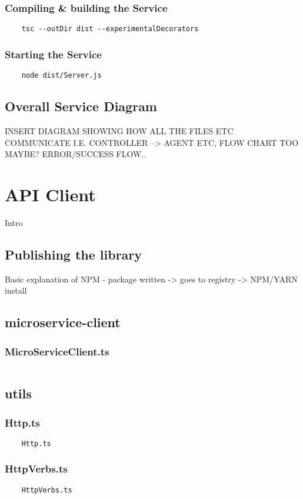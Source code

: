 \subsubsection{Compiling \& building the Service}
\begin{verbatim}
    tsc --outDir dist --experimentalDecorators
\end{verbatim}
\subsubsection{Starting the Service}
\begin{verbatim}
    node dist/Server.js
\end{verbatim}

\subsection{Overall Service Diagram}
INSERT DIAGRAM SHOWING HOW ALL THE FILES ETC COMMUNICATE I.E. CONTROLLER --> AGENT ETC, FLOW CHART TOO MAYBE? ERROR/SUCCESS FLOW..

\section{API Client}
Intro
\subsection{Publishing the library}
    Basic explanation of NPM - package written -> goes to registry -> NPM/YARN install
\subsection{microservice-client}
\subsubsection{MicroServiceClient.ts}
\begin{verbatim}
\end{verbatim}
\subsection{utils}
\subsubsection{Http.ts}
\begin{verbatim}
    Http.ts
\end{verbatim}
\subsubsection{HttpVerbs.ts}
\begin{verbatim}
    HttpVerbs.ts
\end{verbatim}
